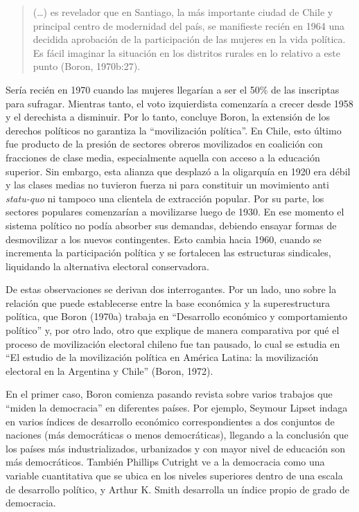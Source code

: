 \begin{quote}
(\ldots) es revelador que en Santiago, la más importante ciudad de Chile y principal centro de modernidad del país, se manifieste recién en 1964 una decidida aprobación de la participación de las mujeres en la vida política. Es fácil imaginar la situación en los distritos rurales en lo relativo a este punto (Boron, 1970b:27).
\end{quote}

Sería recién en 1970 cuando las mujeres llegarían a ser el 50\% de las inscriptas para sufragar. Mientras tanto, el voto izquierdista comenzaría a crecer desde 1958 y el derechista a disminuir. Por lo tanto, concluye Boron, la extensión de los derechos políticos no garantiza la ``movilización política''. En Chile, esto último fue producto de la presión de sectores obreros movilizados en coalición con fracciones de clase media, especialmente aquella con acceso a la educación superior. Sin embargo, esta alianza que desplazó a la oligarquía en 1920 era débil y las clases medias no tuvieron fuerza ni para constituir un movimiento anti \emph{statu-quo} ni tampoco una clientela de extracción popular. Por su parte, los sectores populares comenzarían a movilizarse luego de 1930. En ese momento el sistema político no podía absorber sus demandas, debiendo ensayar formas de desmovilizar a los nuevos contingentes. Esto cambia hacia 1960, cuando se incrementa la participación política y se fortalecen las estructuras sindicales, liquidando la alternativa electoral conservadora.

De estas observaciones se derivan dos interrogantes. Por un lado, uno sobre la relación que puede establecerse entre la base económica y la superestructura política, que Boron (1970a) trabaja en ``Desarrollo económico y comportamiento político'' y, por otro lado, otro que explique de manera comparativa por qué el proceso de movilización electoral chileno fue tan pausado, lo cual se estudia en ``El estudio de la movilización política en América Latina: la movilización electoral en la Argentina y Chile'' (Boron, 1972).

En el primer caso, Boron comienza pasando revista sobre varios trabajos que ``miden la democracia'' en diferentes países. Por ejemplo, Seymour Lipset indaga en varios índices de desarrollo económico correspondientes a dos conjuntos de naciones (más democráticas o menos democráticas), llegando a la conclusión que los países más industrializados, urbanizados y con mayor nivel de educación son más democráticos. También Phillips Cutright ve a la democracia como una variable cuantitativa que se ubica en los niveles superiores dentro de una escala de desarrollo político, y Arthur K. Smith desarrolla un índice propio de grado de democracia.


